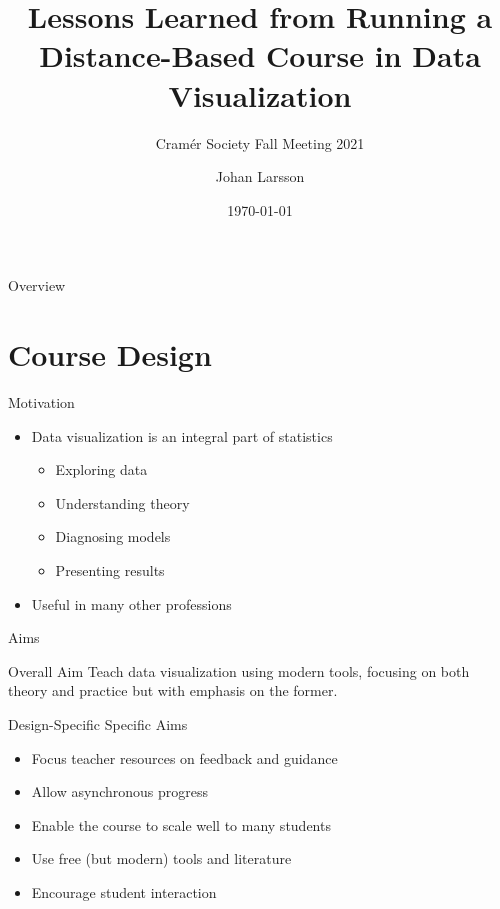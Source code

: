 



\title{Lessons Learned from Running a Distance-Based Course in Data
  Visualization}
\subtitle{Cramér Society Fall Meeting 2021}
\author{Johan Larsson}
\date{\today}



\begin{frame}{Overview}
  \tableofcontents
\end{frame}

\section{Course Design}

\begin{frame}{Motivation}
  \begin{itemize}
    \item Data visualization is an integral part of statistics
          \begin{itemize}
            \item Exploring data
            \item Understanding theory
            \item Diagnosing models
            \item Presenting results
          \end{itemize}
    \item Useful in many other professions
  \end{itemize}
\end{frame}

\begin{frame}{Aims}
  \begin{block}{Overall Aim}
    Teach data visualization using modern tools, focusing on both theory and
    practice but with emphasis on the former.
  \end{block}

  \begin{block}{Design-Specific Specific Aims}
    \begin{itemize}
      \item Focus teacher resources on feedback and guidance
      \item Allow asynchronous progress
      \item Enable the course to scale well to many students
      \item Use free (but modern) tools and literature
      \item Encourage student interaction
    \end{itemize}
  \end{block}
\end{frame}

